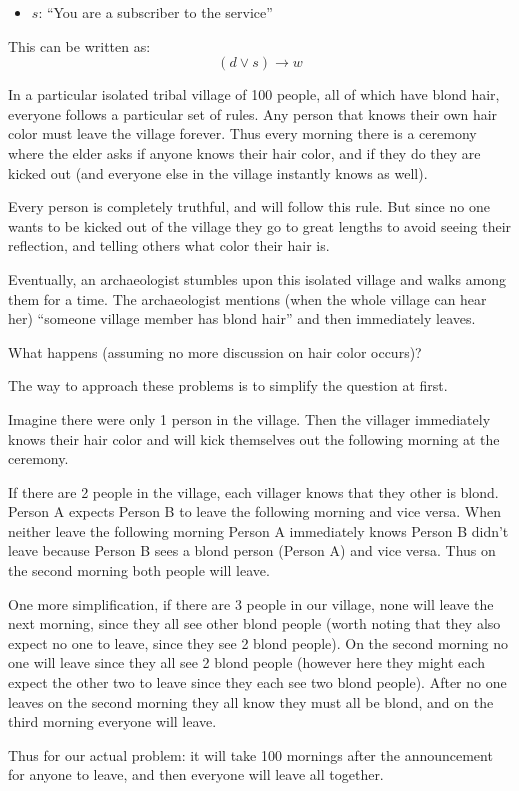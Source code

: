 \documentclass[addpoints]{exam}
\begin{document}
\begin{questions}
\begin{itemize}
    \item $s$: ``You are a subscriber to the service''
  \end{itemize}

  \begin{solution}
    This can be written as:
    \[
      (d\vee s)\rightarrow w
    \]
  \end{solution}

  \question[9] In a particular isolated tribal village of 100 people, all
  of which have blond hair, everyone follows a particular set of rules. Any
  person that knows their own hair color must leave the village forever. Thus
  every morning there is a ceremony where the elder asks if anyone knows their
  hair color, and if they do they are kicked out (and everyone else in the
  village instantly knows as well). 

  Every person is completely truthful, and will follow this rule. But since no
  one wants to be kicked out of the village they go to great lengths to avoid
  seeing their reflection, and telling others what color their hair is.

  Eventually, an archaeologist stumbles upon this isolated village and walks
  among them for a time. The archaeologist mentions (when the whole village can
  hear her) ``someone village member has blond hair'' and then immediately
  leaves.

  What happens (assuming no more discussion on hair color occurs)?

  \begin{solution}
    The way to approach these problems is to simplify the question at first.

    Imagine there were only 1 person in the village. Then the villager
    immediately knows their hair color and will kick themselves out the
    following morning at the ceremony.

    If there are 2 people in the village, each villager knows that they other is
    blond. Person A expects Person B to leave the following morning and vice
    versa. When neither leave the following morning Person A immediately knows
    Person B didn't leave because Person B sees a blond person (Person A) and
    vice versa. Thus on the second morning both people will leave.

    One more simplification, if there are 3 people in our village, none will
    leave the next morning, since they all see other blond people (worth noting
    that they also expect no one to leave, since they see 2 blond people). On
    the second morning no one will leave since they all see 2 blond people 
    (however here they might each expect the other two to leave since they each
    see two blond people). After no one leaves on the second morning they all
    know they must all be blond, and on the third morning everyone will leave.

    Thus for our actual problem: it will take 100 mornings after the
    announcement for anyone to leave, and then everyone will leave all together.
  \end{solution}
\end{questions}
\end{document}
